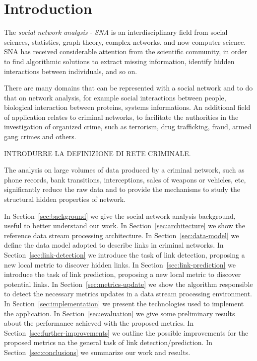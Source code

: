 \section{Introduction}
\label{sec:introduction}

The \textit{social network analysis} - \textit{SNA} is an interdisciplinary field from social sciences, statistics, graph theory, complex networks, and now computer science. SNA has received considerable attention from the scientific community, in order to find algorithmic solutions to extract missing information, identify hidden interactions between individuals, and so on.
 
There are many domains that can be represented with a social network and to do that on network analysis, for example social interactions between people, biological interaction between proteins, systems informations. An additional field of application relates to criminal networks, to facilitate the authorities in the investigation of organized crime, such as terrorism, drug trafficking, fraud, armed gang crimes and others\cite{xu2005criminal}. 

INTRODURRE LA DEFINIZIONE DI RETE CRIMINALE.

The analysis on large volumes of data produced by a criminal network, such as phone records, bank transitions, interceptions, sales of weapons or vehicles, etc, significantly reduce the raw data and to provide the mechanisms to study the structural hidden properties of network\cite{xu2005criminal}.

In Section~\ref{sec:background} we give the social network analysis background, useful to better understand our work.
In Section~\ref{sec:architecture} we show the reference data stream processing architecture.
In Section~\ref{sec:data-model} we define the data model adopted to describe links in criminal networks.
In Section~\ref{sec:link-detection} we introduce the task of link detection, proposing a new local metric to discover hidden links.
In Section~\ref{sec:link-prediction} we introduce the task of link prediction, proposing a new local metric to discover potential links.
In Section~\ref{sec:metrics-update} we show the algorithm responsible to detect the necessary metrics updates in a data stream processing environment.
In Section~\ref{sec:implementation} we present the technologies used to implement the application.
In Section~\ref{sec:evaluation} we give some preliminary results about the performance achieved with the proposed metrics.
In Section~\ref{sec:further-improvements} we outline the possible improvements for the proposed metrics na the general task of link detection/prediction.
In Section~\ref{sec:conclusions} we summarize our work and results.
